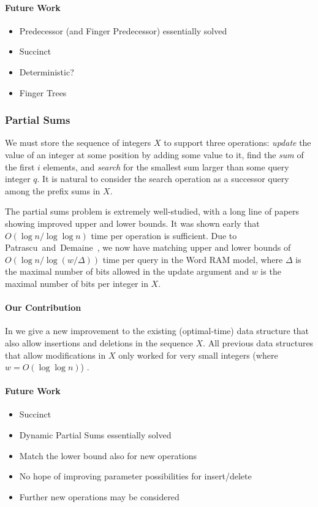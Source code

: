 \paragraph{Future Work}
\begin{itemize}
    \item Predecessor (and Finger Predecessor) essentially solved
    \item Succinct
    \item Deterministic?
    \item Finger Trees
\end{itemize}


\clearpage
\subsubsection{Partial Sums}
We must store the sequence of integers $X$ to support three operations: \emph{update} the value of an integer at some position by adding some value to it, find the \emph{sum} of the first $i$ elements, and \emph{search} for the smallest sum larger than some query integer $q$. It is natural to consider the search operation as a successor query among the prefix sums in $X$. 

The partial sums problem is extremely well-studied, with a long line of papers showing improved upper and lower bounds. It was shown early that $O(\log n / \log \log n)$ time per operation is sufficient. Due to Patrascu~and~Demaine~\cite{PatrascuDemaine, Others?}, we now have matching upper and lower bounds of $O(\log n / \log (w / \Delta))$  time per query in the Word RAM model, where $\Delta$ is the maximal number of bits allowed in the update argument and $w$ is the maximal number of bits per integer in $X$. 

\paragraph{Our Contribution} 
In  we give a new improvement to the existing (optimal-time) data structure that also allow insertions and deletions in the sequence $X$. All previous data structures that allow modifications in $X$ only worked for very small integers (where $w = O(\log \log n)$) . 

\paragraph{Future Work}
\begin{itemize}
    \item Succinct
    \item Dynamic Partial Sums essentially solved
    \item Match the lower bound also for new operations
    \item No hope of improving parameter possibilities for insert/delete
    \item Further new operations may be considered
\end{itemize}

